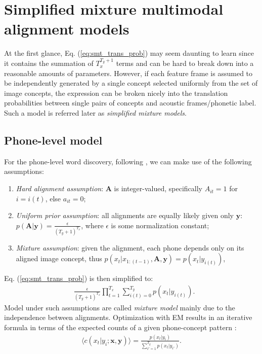 \documentclass[journal]{IEEEtran}
\begin{document}
\section{Simplified mixture multimodal alignment models}
At the first glance, Eq. (\ref{eq:smt_trans_prob}) may seem daunting to learn since it contains the summation of $T_x^{T_y+1}$ terms and can be hard to break down into a reasonable amounts of parameters. However, if each feature frame is assumed to be independently generated by a single concept selected uniformly from the set of image concepts, the expression can be broken nicely into the translation probabilities between single pairs of concepts and acoustic frames/phonetic label. Such a model is referred later as \textit{simplified mixture models}.

\subsection{Phone-level model}
 For the phone-level word discovery, following \cite{Brown92}, we can make use of the following assumptions:
\begin{enumerate}
    \item \textit{Hard alignment assumption}: $\mathbf{A}$ is integer-valued, specifically $A_{it}=1$ for $i=i(t)$, else $a_{it}=0$;
    \item \textit{Uniform prior assumption}: all alignments are equally likely given only $\mathbf{y}$: $p(\mathbf A|\mathbf y) = \frac{\epsilon}{(T_y+1)^{T_x}}$, where $\epsilon$ is some normalization constant;
    \item \textit{Mixture assumption}: given the alignment,
each phone depends only on its aligned image concept, thus
$p(x_t|x_{1:(t-1)},\mathbf{A},\mathbf{y})=p(x_t|y_{i(t)})$,
\end{enumerate}
Eq. (\ref{eq:smt_trans_prob}) is then simplified to:
\begin{align}
    &\frac{\epsilon}{(T_y+1)^{T_x}}\prod_{t=1}^{T_x}\sum_{i(t)=0}^{T_y} p(x_t|y_{i(t)}).
\end{align}
Model under such assumptions are called \textit{mixture model} mainly due to the independence between alignments. Optimization with EM results in 
an iterative formula
in terms of the expected counts of a given phone-concept pattern \cite{Brown93}:
\begin{align}
\label{eq:expected_count_ibm1}
    \langle c(x_t|y_i;\mathbf x, \mathbf y)\rangle = \frac{p(x_t|y_i)}{\sum_{i'=1}^{T_y}p(x_t|y_{i'})}.
\end{align}
\end{document}
